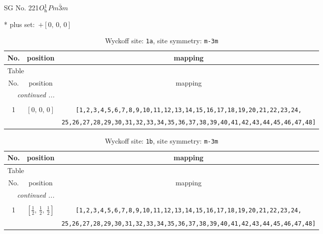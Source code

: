 \documentclass[fleqn,8pt]{jsarticle}
\begin{document}
\setcounter{MaxMatrixCols}{32}

\renewcommand{\tablename}{Table~}
\renewcommand{\figurename}{Figure~}
\begin{center}
\LARGE
SG No. 221\quad$O_{\rm h}^{1}$\quad$Pm\bar{3}m$\quad[ cubic ]
\end{center}
* plus set:\,\,\,$+\left[ 0,\, 0,\, 0 \right]$
\renewcommand{\arraystretch}{1.2}
\begin{longtable}{ccc}
\caption{Wyckoff site: {\tt 1a}, site symmetry: {\tt m-3m}}
 \\
 \hline \hline
No. & position & mapping \\ \hline \endfirsthead

\multicolumn{2}{l}{\tablename\ \thetable{}} \\
 \hline \hline
No. & position & mapping \\ \hline \endhead

 \hline \hline
\multicolumn{2}{r}{\footnotesize\it continued ...} \\ \endfoot

 \hline \hline
\multicolumn{2}{r}{} \\ \endlastfoot

1 & $\left[ 0,\, 0,\, 0 \right]$ & {\tt [1,2,3,4,5,6,7,8,9,10,11,12,13,14,15,16,17,18,19,20,21,22,23,24,} \\ \hline
 &  & {\tt 25,26,27,28,29,30,31,32,33,34,35,36,37,38,39,40,41,42,43,44,45,46,47,48]} \\
\end{longtable}
\renewcommand{\arraystretch}{1.2}
\begin{longtable}{ccc}
\caption{Wyckoff site: {\tt 1b}, site symmetry: {\tt m-3m}}
 \\
 \hline \hline
No. & position & mapping \\ \hline \endfirsthead

\multicolumn{2}{l}{\tablename\ \thetable{}} \\
 \hline \hline
No. & position & mapping \\ \hline \endhead

 \hline \hline
\multicolumn{2}{r}{\footnotesize\it continued ...} \\ \endfoot

 \hline \hline
\multicolumn{2}{r}{} \\ \endlastfoot

1 & $\left[ \frac{1}{2},\, \frac{1}{2},\, \frac{1}{2} \right]$ & {\tt [1,2,3,4,5,6,7,8,9,10,11,12,13,14,15,16,17,18,19,20,21,22,23,24,} \\ \hline
 &  & {\tt 25,26,27,28,29,30,31,32,33,34,35,36,37,38,39,40,41,42,43,44,45,46,47,48]} \\
\end{longtable}
\end{document}
